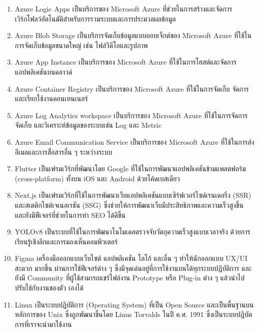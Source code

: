 \begin{enumerate}
    \item Azure Logic Apps เป็นบริการของ Microsoft Azure ที่ช่วยในการสร้างและจัดการเวิร์กโฟลว์อัตโนมัติสำหรับการรวมระบบและการประมวลผลข้อมูล

    \item Azure Blob Storage เป็นบริการจัดเก็บข้อมูลแบบออบเจ็กต์ของ Microsoft Azure ที่ใช้ในการจัดเก็บข้อมูลขนาดใหญ่ เช่น ไฟล์วิดีโอและรูปภาพ

    \item Azure App Instance เป็นบริการของ Microsoft Azure ที่ใช้ในการโฮสต์และจัดการแอปพลิเคชันบนคลาวด์

    \item Azure Container Registry เป็นบริการของ Microsoft Azure ที่ใช้ในการจัดเก็บ จัดการ และเรียกใช้งานคอนเทนเนอร์

    \item Azure Log Analytics workspace เป็นบริการของ Microsoft Azure ที่ใช้ในการจัดการ จัดเก็บ และวิเคราะห์ข้อมูลของระบบเช่น Log และ Metric

    \item Azure Email Communication Service เป็นบริการของ Microsoft Azure ที่ใช้ในการส่งอีเมลและการสื่อสารอื่น ๆ ระหว่างระบบ

    \item Flutter เป็นเฟรมเวิร์กที่พัฒนาโดย Google ที่ใช้ในการพัฒนาแอปพลิเคชันข้ามแพลตฟอร์ม (cross-platform) ทั้งบน iOS และ Android ด้วยโค้ดเบสเดียว
    
    \item Next.js เป็นเฟรมเวิร์กที่ใช้ในการพัฒนาเว็บแอปพลิเคชันแบบเซิร์ฟเวอร์ไซด์เรนเดอริ่ง (SSR) และสเตติกไซต์เจเนอเรชัน (SSG) 
    ซึ่งช่วยให้การพัฒนาเว็บมีประสิทธิภาพและความเร็วสูงขึ้น และยังมีฟีเจอร์ที่ช่วยในการทำ SEO ได้ดีขึ้น
    
    \item YOLOv8 เป็นระบบที่ใช้ในการพัฒนาโนโมเดลตรวจจับวัตถุความเร็วสูงแบบเวลาจริง ด้วยการเรียนรู้เชิงลึกและการมองเห็นคอมพิวเตอร์ 
    
    \item Figma เครื่องมือออกแบบเว็บไซต์ แอปพลิเคชัน โลโก้ และอื่น ๆ ทําให้นักออกแบบ UX/UI สะดวก มากขึ้น ผ่านการใช้ฟีเจอร์ต่าง ๆ 
    ซึ่งมีจุดเด่นอยู่ที่การใช้งานบนได้ทุกระบบปฏิบัติการ และยังมี Community ที่ผู้ใช้สามารถแชร์ไฟล์งาน Prototype หรือ Plug-in ต่าง ๆ 
    แล้วนําไปปรับใช้กับงานของตัว เองได้ 

    \item Linux เป็นระบบปฏิบัติการ (Operating System) ที่เป็น Open Source และเป็นพื้นฐานบนหลักการของ Unix ซึ่งถูกพัฒนาขึ้นโดย 
    Linus Torvalds ในปี ค.ศ. 1991 ซึ่งเป็นระบบปฎิบัตการที่เราจะนำมาใช้งาน 


\end{enumerate}
